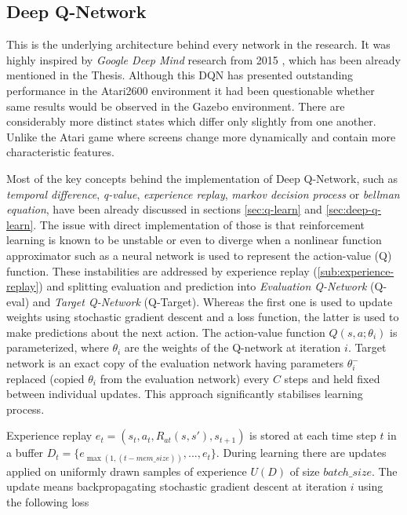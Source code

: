 \subsection{Deep Q-Network}
\label{sub:deep-q-network}

This is the underlying architecture behind every network in the research. It was highly inspired by \emph{Google Deep Mind} research from 2015 \cite{DQNAtari}, which has been already mentioned in the Thesis. Although this DQN has presented outstanding performance in the Atari2600 environment it had been questionable whether same results would be observed in the Gazebo environment. There are considerably more distinct states which differ only slightly from one another. Unlike the Atari game where screens change more dynamically and contain more characteristic features.

Most of the key concepts behind the implementation of Deep Q-Network, such as \emph{temporal difference}, \emph{q-value}, \emph{experience replay}, \emph{markov decision process} or \emph{bellman equation}, have been already discussed in sections \ref{sec:q-learn} and \ref{sec:deep-q-learn}.
The issue with direct implementation of those is that reinforcement learning is known to be unstable or even to diverge when a nonlinear function approximator such as a neural network is used to represent the action-value (Q) function. These instabilities are addressed by experience replay (\ref{sub:experience-replay}) and splitting evaluation and prediction into \emph{Evaluation Q-Network} (Q-eval) and \emph{Target Q-Network} (Q-Target). Whereas the first one is used to update weights using stochastic gradient descent and a loss function, the latter is used to make predictions about the next action. The action-value function $Q(s, a; \theta_i)$ is parameterized, where $\theta_i$ are the weights of the Q-network at iteration $i$. Target network is an exact copy of the evaluation network having parameters $\theta^-_i$ replaced (copied $\theta_i$ from the evaluation network) every $C$ steps and held fixed between individual updates. This approach significantly stabilises learning process.

Experience replay $e_t = (s_t, a_t, R_{at}(s, s'), s_{t+1})$ is stored at each time step $t$ in a buffer $D_t = \{e_{\max\left(1, (t - mem\_size)\right)}, ..., e_t\}$. During learning there are updates applied on uniformly drawn samples of experience $U(D)$ of size $batch\_size$. The update means backpropagating stochastic gradient descent at iteration $i$ using the following loss

